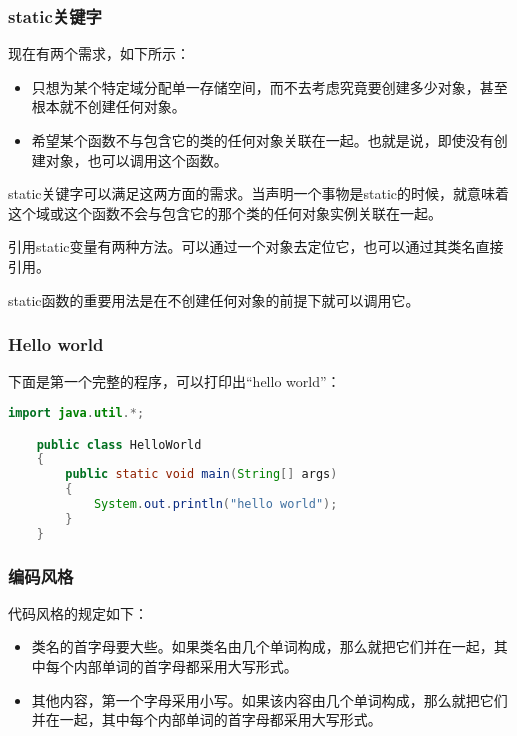 \documentclass[a4paper,left=2.5cm,right=2.5cm,11pt]{article}
\begin{document}
\subsubsection{static关键字}
	现在有两个需求，如下所示：
	\begin{itemize}
		\item 只想为某个特定域分配单一存储空间，而不去考虑究竟要创建多少对象，甚至根本就不创建任何对象。
		\item 希望某个函数不与包含它的类的任何对象关联在一起。也就是说，即使没有创建对象，也可以调用这个函数。
	\end{itemize}

	static关键字可以满足这两方面的需求。当声明一个事物是static的时候，就意味着这个域或这个函数不会与包含它的那个类的任何对象实例关联在一起。\par
	引用static变量有两种方法。可以通过一个对象去定位它，也可以通过其类名直接引用。\par
	static函数的重要用法是在不创建任何对象的前提下就可以调用它。
\subsubsection{Hello world}
	下面是第一个完整的程序，可以打印出“hello world”：
	\begin{lstlisting}[language = Java]
	import java.util.*;

	public class HelloWorld
	{
		public static void main(String[] args)
		{
			System.out.println("hello world");
		}
	}
	\end{lstlisting}
\subsubsection{编码风格}
	代码风格的规定如下：
	\begin{itemize}
		\item 类名的首字母要大些。如果类名由几个单词构成，那么就把它们并在一起，其中每个内部单词的首字母都采用大写形式。
		\item 其他内容，第一个字母采用小写。如果该内容由几个单词构成，那么就把它们并在一起，其中每个内部单词的首字母都采用大写形式。
	\end{itemize}

\end{document}
